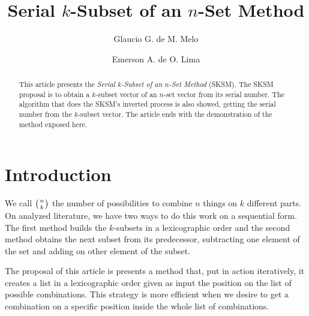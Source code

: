 \documentclass {amsart}
\newcommand{\emerson}{Emerson A. de O. Lima}
\newcommand{\glaucio}{Glaucio G. de M. Melo}
\begin{document}
\title[Serial {$k$}-Subset of an {$n$}-Set Method]
 {Serial {$k$}-Subset of an {$n$}-Set Method}


\author[Melo]{\glaucio}
\address[Melo]{Departamento de Estat\'{\i}stica e Inform\'{a}tica - UNICAP}


\author[Oliveira-Lima]{\emerson}
\address[Oliveira-Lima]{Departamento de Estat\'{\i}stica e Inform\'{a}tica - UNICAP}




\begin{abstract}
This article presents the \emph{Serial {$k$}-Subset of an
{$n$}-Set Method} (SKSM). The SKSM proposal is to obtain a
{$k$}-subset vector of an {$n$}-set vector from its serial number.
The algorithm that does the SKSM's inverted process is also
showed, getting the serial number from the {$k$}-subset vector.
The article ends with the demonstration of the method exposed
here.
\end{abstract}
 \maketitle
\section*{Introduction}
We call {$\big({n \atop k}\big)$} the number of possibilities to
combine {$n$} things on {$k$} different parts. On analyzed
literature\cite{wi}, we have two ways to do this work on a
sequential form. The first method builds the {$k$}-subsets in a
lexicographic order and the second method obtains the next subset
from its predecessor, subtracting one element of the set and
adding on other element of the subset.

The proposal of this article is presents a method that, put in
action iteratively, it creates a list in a lexicographic order 
given as input the position on the list of possible combinations.
This strategy is more efficient when we desire to get a
combination on a specific position inside the whole list of
combinations.
\end{document}
